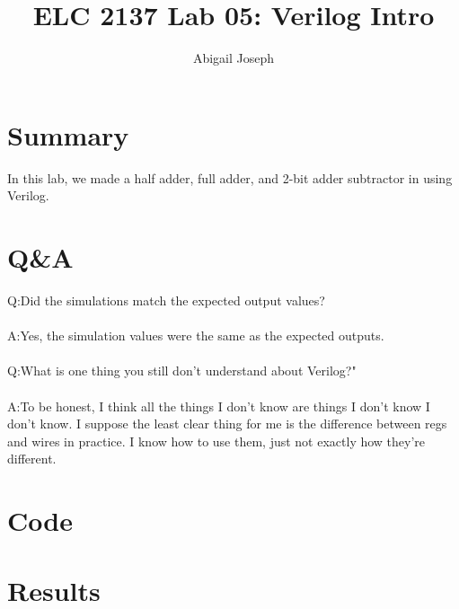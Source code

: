 \documentclass[11pt]{article}
\newcommand{\Verilog}[2][]{%
	
}
\begin{document}
\title{ELC 2137 Lab 05: Verilog Intro}
\author{Abigail Joseph}

\maketitle


\section*{Summary}

In this lab, we made a half adder, full adder, and 2-bit adder subtractor in using Verilog.  


\section*{Q\&A}

Q:Did the simulations match the expected output values? \\
\\
A:Yes, the simulation values were the same as the expected outputs.  \\
\\
Q:What is one thing you still don't understand about Verilog?" \\
\\
A:To be honest, I think all the things I don't know are things I don't know I don't know. I suppose the least clear thing for me is the difference between regs and wires in practice. I know how to use them, just not exactly how they're different. 


\section*{Code}

\Verilog[firstline=23, caption=Half Adder,label=code:file_1]{halfadder.sv}
\Verilog[firstline=23, caption=Half Adder Test,label=code:file_2]{halfadder_test.sv}
\Verilog[firstline=23, caption=Full Adder,label=code:file_3]{fulladder.sv}
\Verilog[firstline=23, caption=Full Adder Test,label=code:file_4]{fulladder_test.sv}
\Verilog[firstline=23, caption=Adder-Subtractor,label=code:file_5]{addsub.sv}
\Verilog[firstline=23, caption=Half Adder,label=code:file_1]{addsub_test.sv}


\section*{Results}
\end{document}
